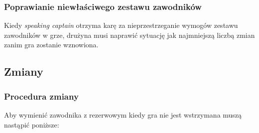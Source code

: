 \documentclass[11pt,a4paper]{article}
\begin{document}
\subsubsection{Poprawianie niewłaściwego zestawu zawodników}
Kiedy \emph{speaking captain} otrzyma karę za nieprzestrzeganie wymogów zestawu zawodników w grze, drużyna musi naprawić sytuację jak najmniejszą liczbą zmian zanim gra zostanie wznowiona.

\subsection{Zmiany}

\subsubsection{Procedura zmiany}
Aby wymienić zawodnika z rezerwowym kiedy gra nie jest wstrzymana muszą nastąpić poniższe:
\end{document}
